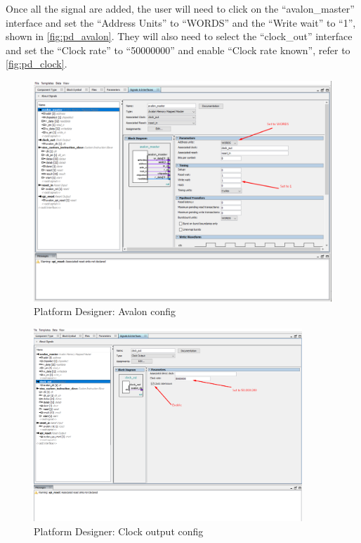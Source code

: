 Once all the signal are added, the user will need to click on the “avalon\_master” interface and set the “Address Units” to “WORDS” and the “Write wait” to “1”, shown in \autoref{fig:pd_avalon}. They will also need to select the “clock\_out” interface and set the “Clock rate” to “50000000” and enable “Clock rate known”, refer to \autoref{fig:pd_clock}.

\begin{figure}[!h]
    \centering
    \includegraphics[width=1\textwidth]{05_evaluation/images/pd_avalon_config.png}
    \caption{Platform Designer: Avalon config}
    \label{fig:pd_avalon}
\end{figure}


\begin{figure}[!h]
    \centering
    \includegraphics[width=0.9\textwidth]{05_evaluation/images/pd_clock.png}
    \caption{Platform Designer: Clock output config}
    \label{fig:pd_clock}
\end{figure}

